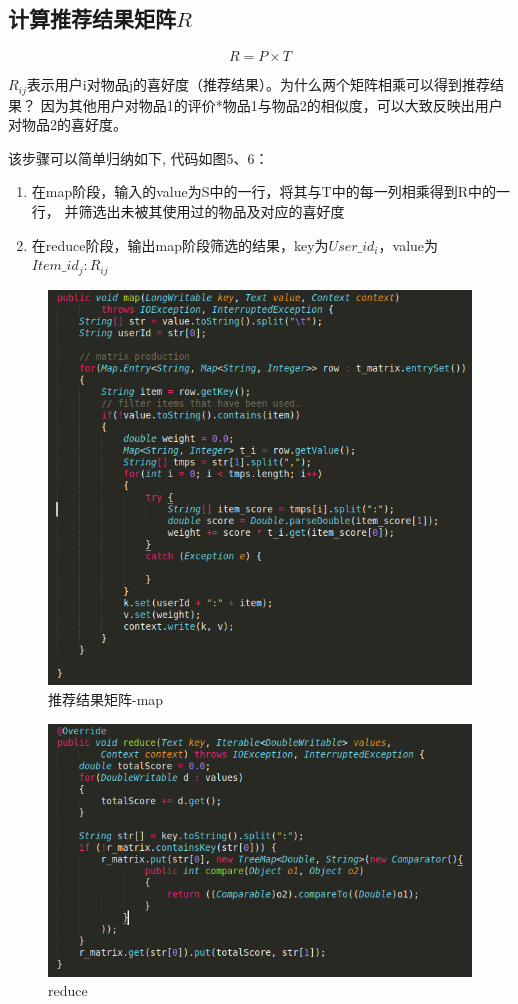 \documentclass[12pt, a4paper]{article}
\begin{document}
\subsection{计算推荐结果矩阵$R$}
\begin{equation}
  R = P \times T
\end{equation}
\par $R_{ij}$表示用户i对物品j的喜好度（推荐结果）。为什么两个矩阵相乘可以得到推荐结果？
因为其他用户对物品1的评价*物品1与物品2的相似度，可以大致反映出用户对物品2的喜好度。
\par 该步骤可以简单归纳如下, 代码如图5、6：
\begin{enumerate}
  \item 在map阶段，输入的value为S中的一行，将其与T中的每一列相乘得到R中的一行，
  并筛选出未被其使用过的物品及对应的喜好度
  \item 在reduce阶段，输出map阶段筛选的结果，key为$User\_id_i$，value为$Item\_id_j:R_{ij}$
\end{enumerate}
\begin{figure}[ht]
\centering
\includegraphics[scale=0.5]{m3.png}
\caption{推荐结果矩阵-map}
\end{figure}

\begin{figure}[ht]
\centering
\includegraphics[scale=0.5]{r3.png}
\caption{reduce}
\end{figure}
\end{document}
